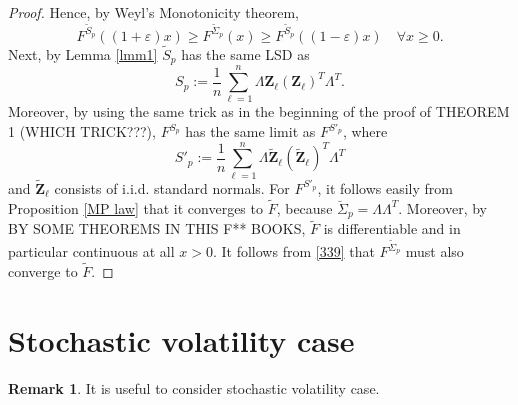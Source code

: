 \documentclass[a4paper,11pt]{article}
\theoremstyle{plain}
\theoremstyle{definition}
\newtheorem{rmrk}[thm]{Remark}
\begin{document}
\begin{proof}
    	 Hence, by Weyl's Monotonicity theorem,
    	 \begin{equation} \label{339}
    	     F^{\widetilde{S}_p}((1+\varepsilon)x) \geq F^{\widetilde{\Sigma}_p}(x) \geq F^{\widetilde{S}_p}((1-\varepsilon)x) \quad \forall x \geq 0.
    	 \end{equation}
    	 Next, by Lemma \ref{lmm1} $\widetilde{S}_p$ has the same LSD as 
    	 \[S_p := \frac{1}{n} \sum_{\ell=1}^{n} \Lambda \mathbf{Z}_\ell (\mathbf{Z}_\ell)^T \Lambda^T.\]
    	 Moreover, by using the same trick as in the beginning of the proof of THEOREM 1 (WHICH TRICK???), $F^{S_p}$ has the same limit as $F^{S'_p}$, where
    	 \[S'_p := \frac{1}{n} \sum_{\ell=1}^{n} \Lambda \widetilde{\mathbf{Z}}_\ell (\widetilde{\mathbf{Z}}_\ell)^T \Lambda^T\]
    	 and $\widetilde{\mathbf{Z}}_\ell$ consists of i.i.d. standard normals. For $F^{S'_p}$, it follows easily from Proposition \ref{MP law} that it converges to $\widetilde{F}$, because $\breve{\Sigma}_p = \Lambda \Lambda^T$. Moreover, by BY SOME THEOREMS IN THIS F** BOOKS, $\widetilde{F}$ is differentiable and in particular continuous at all $x > 0$. It follows from \eqref{339} that $F^{\widetilde{\Sigma}_p}$ must also converge to $\widetilde{F}$.
    \end{proof}
    
    \pagebreak
    \part{Stochastic volatility case}
    \begin{rmrk}
    	It is useful to consider stochastic volatility case.
    \end{rmrk}
    
\end{document}
